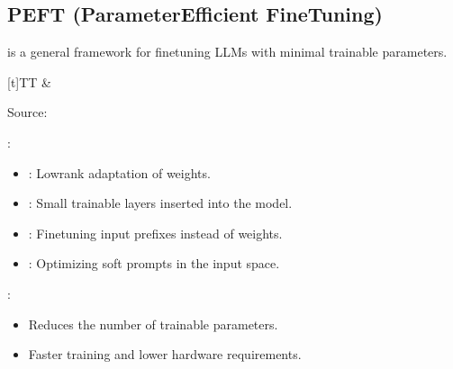 \documentclass[letterpaper,11pt,english]{sphinxmanual}
\begin{document}
\subsection{PEFT (Parameter\sphinxhyphen{}Efficient Fine\sphinxhyphen{}Tuning)}
\label{\detokenize{finetuning:peft-parameter-efficient-fine-tuning}}
\sphinxAtStartPar
{} is a general framework for fine\sphinxhyphen{}tuning LLMs with minimal trainable parameters.


\begin{savenotes}\sphinxattablestart
\sphinxthistablewithglobalstyle
\sphinxthistablewithborderlessstyle
\centering
\begin{tabulary}{\linewidth}[t]{TT}
\sphinxtoprule
\sphinxtableatstartofbodyhook
\noindent{}
&
\noindent{}
\\
\sphinxbottomrule
\end{tabulary}
\sphinxtableafterendhook\par
\sphinxattableend\end{savenotes}

\sphinxAtStartPar
Source: 

\sphinxAtStartPar
{}:
\begin{itemize}
\item {} 
\sphinxAtStartPar
{}: Low\sphinxhyphen{}rank adaptation of weights.

\item {} 
\sphinxAtStartPar
{}: Small trainable layers inserted into the model.

\item {} 
\sphinxAtStartPar
{}: Fine\sphinxhyphen{}tuning input prefixes instead of weights.

\item {} 
\sphinxAtStartPar
{}: Optimizing soft prompts in the input space.

\end{itemize}

\sphinxAtStartPar
{}:
\begin{itemize}
\item {} 
\sphinxAtStartPar
Reduces the number of trainable parameters.

\item {} 
\sphinxAtStartPar
Faster training and lower hardware requirements.

\end{itemize}
\end{document}
